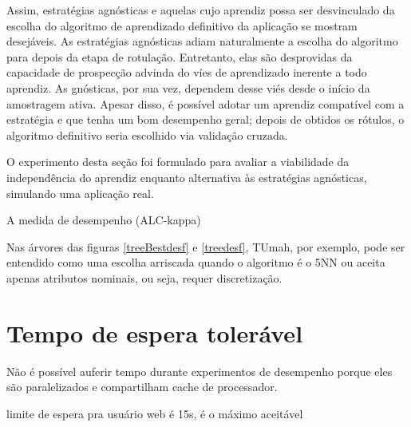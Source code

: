 Assim, estratégias agnósticas e aquelas cujo aprendiz possa ser desvinculado da escolha do
algoritmo de aprendizado definitivo da aplicação se mostram desejáveis.
As estratégias agnósticas adiam naturalmente a escolha do algoritmo para depois da
etapa de rotulação.
Entretanto, elas são desprovidas da capacidade de prospecção advinda do víes de
aprendizado inerente a todo aprendiz.
As gnósticas, por sua vez, dependem desse viés desde o início da amostragem ativa.
Apesar disso, é possível adotar um aprendiz compatível com a estratégia e que tenha um bom
desempenho geral; depois de obtidos os rótulos, o algoritmo definitivo seria escolhido via validação
cruzada.

O experimento desta seção foi formulado para avaliar a viabilidade da independência do aprendiz
enquanto alternativa às estratégias agnósticas, simulando uma aplicação real.

A medida de desempenho (ALC-kappa) 

Nas árvores das figuras \ref{treeBestdesf} e  \ref{treedesf},
TUmah, por exemplo, pode ser entendido como uma escolha arriscada
quando o algoritmo é o 5NN ou aceita apenas atributos nominais, ou seja, requer discretização.


\section{Tempo de espera tolerável}


Não é possível auferir tempo durante experimentos de desempenho porque eles são
paralelizados e compartilham cache de processador.

limite de espera pra usuário web é 15s, é o máximo aceitável
\citep{conf/amcis/Nah03}

